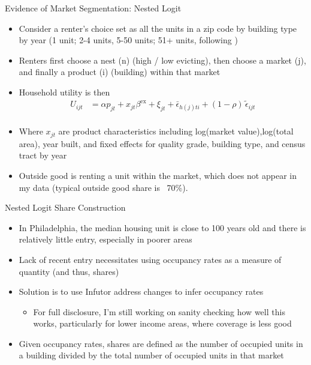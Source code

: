 \documentclass[10pt, xcolor=dvipsnames]{beamer}
\begin{document}
\begin{frame}{Evidence of Market Segmentation: Nested Logit}
    \begin{itemize}
        \item Consider a renter's choice set as all the units in a zip code by building type by year (1 unit; 2-4 units, 5-50 units; 51+ units, following \cite{framoutar2024market, calderwang2024algorithmic})
        \item Renters first choose a nest (n) (high / low evicting), then choose a market (j), and finally a product (i) (building) within that market
        \item Household utility is then \begin{align}
            U_{ijt}
              &= \alpha p_{jt} + x_{jt}\beta^{\mathrm{ex}} + \xi_{jt}
                 + \bar{\epsilon}_{h(j)ti} + (1-\rho)\,\tilde{\epsilon}_{ijt} \tag{6} \\[6pt]
                 \end{align}
        \item Where $x_{jt}$ are product characteristics including log(market value),log(total area), year built, and fixed effects for quality grade, building type, and census tract by year
        \item Outside good is renting a unit within the market, which does not appear in my data (typical outside good share is ~70\%).
    \end{itemize}
    
\end{frame}

\begin{frame}{Nested Logit Share Construction}
    \begin{itemize}
        \item In Philadelphia, the median housing unit is close to 100 years old and there is relatively little entry, especially in poorer areas
        \item Lack of recent entry necessitates using occupancy rates as a measure of quantity (and thus, shares)
        \item Solution is to use Infutor address changes to infer occupancy rates
        \begin{itemize}
            \item For full disclosure, I'm still working on sanity checking how well this works, particularly for lower income areas, where coverage is less good
        \end{itemize}
        \item Given occupancy rates, shares are defined as the number of occupied units in a building divided by the total number of occupied units in that market
    \end{itemize}
    
\end{frame}
\end{document}
